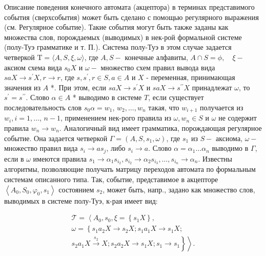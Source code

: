 \documentclass[10pt]{article}
\begin{document}
Описание поведения конечного автомата (акцептора) в терминах представимого события (сверхсобытия) может быть сделано с помощью регулярного выражения (см. Регулярное событие). Такие события могут быть также заданы как множества слов, порождаемых (выводимых) в нек-рой формальной системе (полу-Туэ грамматике и т. П.). Система полу-Туэ в этом случае задается четверкой $\mathrm{T}=\langle A, S, \xi, \omega\rangle$, где $A, S-$ конечные алфавиты, $A \cap S=\phi, \quad \xi-$ аксиом схема вида $s_{0} X$ и $\omega-$ множество схем правил вывода вида $s a X \rightarrow s^{\prime} X, r \rightarrow r$, где $s, s^{\prime}, r \in S, a \in A$ и $X$ - переменная, принимающая значения из $A$ *. При этом, если $s a X \rightarrow s^{\prime} X$ и $s a X \rightarrow s^{\prime \prime} X$ принадлежат $\omega$, то $s^{\prime}=s^{\prime \prime}$. Слово $\alpha \in A$ * выводимо в системе $T$, если существует последовательность слов $s_{0} \alpha=w_{1}$, $w_{2}, \ldots, w_{n}$ такая, что $w_{i+1}$ получается из $w_{i}, i=1, \ldots$, $n-1$, применением нек-рого правила из $\omega, w_{n} \in S$ и $\omega$ не содержит правила $w_{n} \rightarrow w_{n}$. Аналогичный вид имеет грамматика, порождающая регулярное событие. Она задается четверкой $\Gamma=\left(A, S, s_{1}, \omega\right)$, где $s_{1}$ из $S-$ аксиома, $\omega-$ множество правил вида $s_{i} \rightarrow a s_{j}$, либо $s_{i} \rightarrow a$. Слово $\alpha=\alpha_{1} \ldots \alpha_{n}$ выводимо в $\Gamma$, если в $\omega$ имеются правила $s_{1} \rightarrow \alpha_{1} s_{i_{2}}, s_{i_{2}} \rightarrow \alpha_{2} s_{i_{3}}, \ldots, s_{i_{n}} \rightarrow \alpha_{n}$. Известны алгоритмы, позволяющие получать матрицу переходов автомата по формальным системам описанного типа. Так, событие, представимое в акцепторе $\left\langle A_{0}, S_{0}, \varphi_{0}, s_{1}\right\rangle$ состоянием $s_{2}$, может быть, напр., задано как множество слов, выводимых в системе полу-Туэ, к-рая имеет вид:



\[

\begin{gathered}

\mathscr{\mathscr { T }}=\left\langle A_{0}, s_{0}, \xi=\left\{s_{1} X\right\},\right. \\

\omega=\left\{s_{1} a_{2} X \longrightarrow s_{2} X ; s_{1} a_{1} X \longrightarrow s_{1} X ;\right. \\

\left.\left.s_{2} a_{1} X \stackrel{s_{2}}{\longrightarrow} X ; s_{2} a_{2} X \longrightarrow s_{1} X ; s_{1} \longrightarrow s_{1}\right\}\right\rangle .

\end{gathered}

\]
\end{document}
